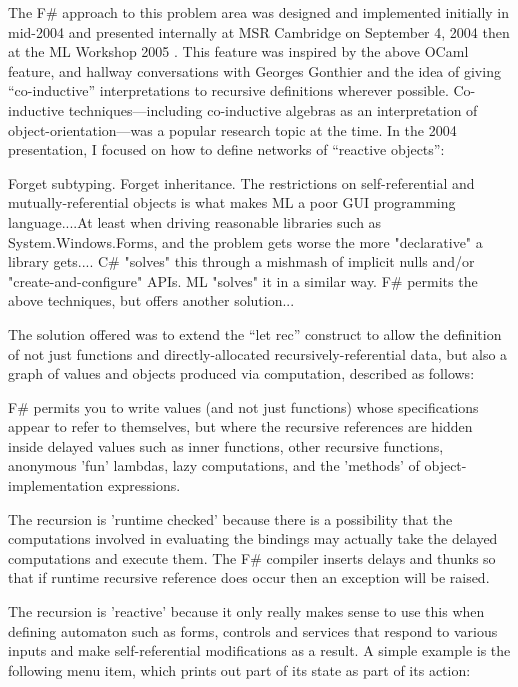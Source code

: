 \documentclass[acmsmall,screen]{acmart}
\begin{document}
The F\# approach to this problem area was designed and implemented initially in mid-2004 and presented internally at MSR Cambridge on September 4, 2004 then at the ML Workshop 2005 \citep{Syme2006}. This feature was inspired by the above OCaml feature, and hallway conversations with Georges Gonthier and the idea of giving “co-inductive” interpretations to recursive definitions wherever possible.  Co-inductive techniques---including co-inductive algebras as an interpretation of object-orientation---was a popular research topic at the time. In the 2004 presentation, I focused on how to define networks of “reactive objects”: 

\begin{verbquote}
Forget subtyping.  Forget inheritance.   The restrictions on self-referential and mutually-referential objects is what makes ML a poor GUI programming language....At least when driving reasonable libraries such as System.Windows.Forms, and the problem gets worse the more "declarative" a library gets.... C# "solves" this through a mishmash of implicit nulls and/or "create-and-configure" APIs.   ML "solves" it in a similar way.  F# permits the above techniques, but offers another solution... 
\end{verbquote}
The solution offered was to extend the “let rec” construct to allow the definition of not just functions and directly-allocated recursively-referential data, but also a graph of values and objects produced via computation, described as follows:
\begin{verbquote}
F# permits you to write values (and not just functions) whose specifications appear to refer to themselves, but where the recursive references are hidden inside delayed values such as inner functions, other recursive functions, anonymous 'fun' lambdas, lazy computations, and the 'methods' of object-implementation expressions. 

The recursion is 'runtime checked' because there is a possibility that the computations involved in evaluating the bindings may actually take the delayed computations and execute them. The F# compiler inserts delays and thunks so that if runtime recursive reference does occur then an exception will be raised.

The recursion is 'reactive' because it only really makes sense to use this when defining automaton such as forms, controls and services that respond to various inputs and make self-referential modifications as a result. A simple example is the following menu item, which prints out part of its state as part of its action:
\end{verbquote}
\end{document}
